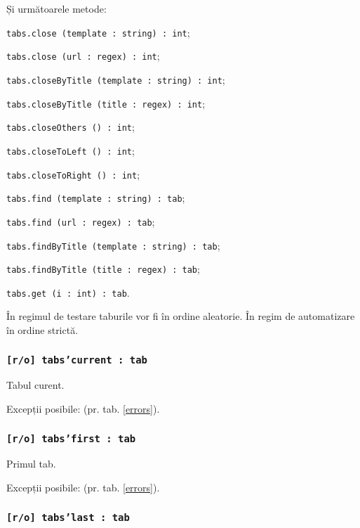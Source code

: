 Și următoarele metode:
\begin{icItems}
	\item \texttt{tabs.close (template : string) : int};
	\item \texttt{tabs.close (url : regex) : int};
	\item \texttt{tabs.closeByTitle (template : string) : int};
	\item \texttt{tabs.closeByTitle (title : regex) : int};
	\item \texttt{tabs.closeOthers () : int};
	\item \texttt{tabs.closeToLeft () : int};
	\item \texttt{tabs.closeToRight () : int};
	\item \texttt{tabs.find (template : string) : tab};
	\item \texttt{tabs.find (url : regex) : tab};
	\item \texttt{tabs.findByTitle (template : string) : tab};
	\item \texttt{tabs.findByTitle (title : regex) : tab};
	\item \texttt{tabs.get (i : int) : tab}.
\end{icItems}

În regimul de testare taburile vor fi în ordine aleatorie. În regim de automatizare în ordine strictă.

\subsubsection{\texttt{[r/o] tabs'current : tab}}

Tabul curent.

Excepții posibile:  (pr. tab. \ref{errors}).

\subsubsection{\texttt{[r/o] tabs'first : tab}}

Primul tab.

Excepții posibile:  (pr. tab. \ref{errors}).

\subsubsection{\texttt{[r/o] tabs'last : tab}}

